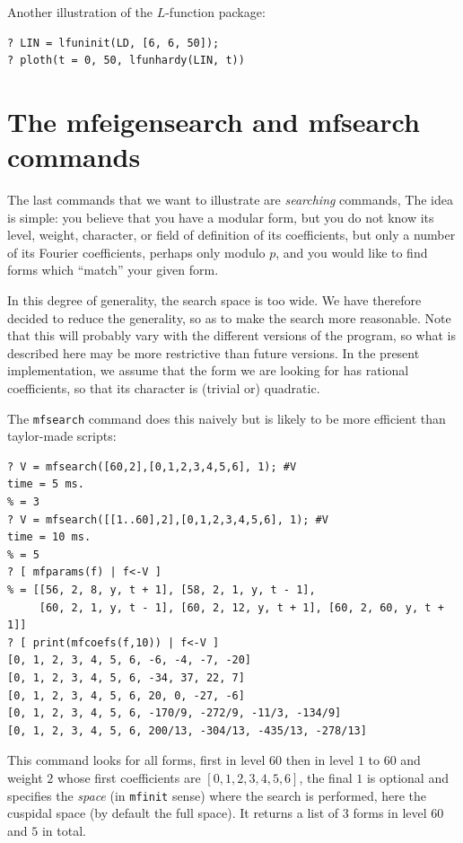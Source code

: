 \documentclass[11pt]{article}
\def\kbd#1{{\tt #1}}
\begin{document}
Another illustration of the $L$-function package:

\begin{verbatim}
? LIN = lfuninit(LD, [6, 6, 50]);
? ploth(t = 0, 50, lfunhardy(LIN, t))
\end{verbatim}


\medskip

\section{The mfeigensearch and mfsearch commands}

The last commands that we want to illustrate are \emph{searching} commands,
The idea is simple: you believe that you have a modular form, but you do not
know its level, weight, character, or field of definition of its
coefficients, but only a number of its Fourier coefficients, perhaps only
modulo $p$, and you would like to find forms which ``match'' your given form.

In this degree of generality, the search space is too wide. We have therefore
decided to reduce the generality, so as to make the search more reasonable.
Note that this will probably vary with the different versions of the program,
so what is described here may be more restrictive than future versions. In
the present implementation, we assume that the form we are looking for has
rational coefficients, so that its character is (trivial or) quadratic.

The \kbd{mfsearch} command does this naively but is likely to be more
efficient than taylor-made scripts:
\begin{verbatim}
? V = mfsearch([60,2],[0,1,2,3,4,5,6], 1); #V
time = 5 ms.
% = 3
? V = mfsearch([[1..60],2],[0,1,2,3,4,5,6], 1); #V
time = 10 ms.
% = 5
? [ mfparams(f) | f<-V ]
% = [[56, 2, 8, y, t + 1], [58, 2, 1, y, t - 1],
     [60, 2, 1, y, t - 1], [60, 2, 12, y, t + 1], [60, 2, 60, y, t + 1]]
? [ print(mfcoefs(f,10)) | f<-V ]
[0, 1, 2, 3, 4, 5, 6, -6, -4, -7, -20]
[0, 1, 2, 3, 4, 5, 6, -34, 37, 22, 7]
[0, 1, 2, 3, 4, 5, 6, 20, 0, -27, -6]
[0, 1, 2, 3, 4, 5, 6, -170/9, -272/9, -11/3, -134/9]
[0, 1, 2, 3, 4, 5, 6, 200/13, -304/13, -435/13, -278/13]
\end{verbatim}
This command looks for all forms, first in level $60$ then in level $1$ to $60$
and weight $2$ whose first coefficients are $[0,1,2,3,4,5,6]$, the final $1$
is optional and specifies the \emph{space} (in \kbd{mfinit} sense) where the
search is performed, here the cuspidal space (by default the full space). It
returns a list of $3$ forms in level $60$ and $5$ in total.
\end{document}
